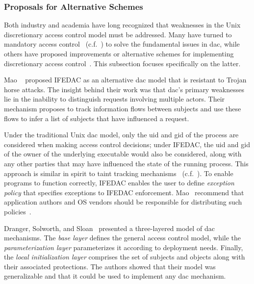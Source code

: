 \subsubsection*{Proposals for Alternative Schemes}

Both industry and academia have long recognized that weaknesses in the Unix discretionary
access control model must be addressed. Many have turned to mandatory access
control~\cite{spencer1999_flask, smalley2001_selinux, wright2002_lsm, cowan2000_apparmor,
schaufler_smack, schreuders2012_towards, hu2013_fsf, harada2004_tomoyo, salaun_landlockio,
singh2019_krsi} (c.f.~) to solve the fundamental issues in \gls{dac}, while
others have proposed improvements or alternative schemes for implementing discretionary
access control~\cite{mao2009_trojan_resistant_dac, solworth2004_layered_dac,
dranger2006_dac_complexity, dittmer2014_setuid, tsafrir2008_setuid, chen2002_setuid}. This
subsection focuses specifically on the latter.

Mao \etal~\cite{mao2009_trojan_resistant_dac} proposed IFEDAC as an alternative \gls{dac}
model that is resistant to Trojan horse attacks. The insight behind their work was that
\gls{dac}'s primary weaknesses lie in the inability to distinguish requests involving
multiple actors. Their mechanism proposes to track information flows between subjects and
use these flows to infer a list of subjects that have influenced a request.

Under the traditional Unix \gls{dac} model, only the \gls{uid} and \gls{gid} of the
process are considered when making access control decisions; under IFEDAC, the \gls{uid}
and \gls{gid} of the owner of the underlying executable would also be considered, along
with any other parties that may have influenced the state of the running process. This
approach is similar in spirit to taint tracking mechanisms~\cite{livshits2012_dynamic}
(c.f.~). To enable programs to function correctly, IFEDAC enables
the user to define \textit{exception policy} that specifies exceptions to IFEDAC
enforcement. Mao \etal~recommend that application authors and OS vendors should be
responsible for distributing such policies~\cite{mao2009_trojan_resistant_dac}.

Dranger, Solworth, and Sloan~\cite{solworth2004_layered_dac, dranger2006_dac_complexity}
presented a three-layered model of \gls{dac} mechanisms. The \textit{base layer} defines
the general access control model, while the \textit{parameterization layer} parameterizes
it according to deployment needs.  Finally, the \textit{local initialization layer}
comprises the set of subjects and objects along with their associated protections. The
authors showed that their model was generalizable and that it could be used to implement
any \gls{dac} mechanism.

